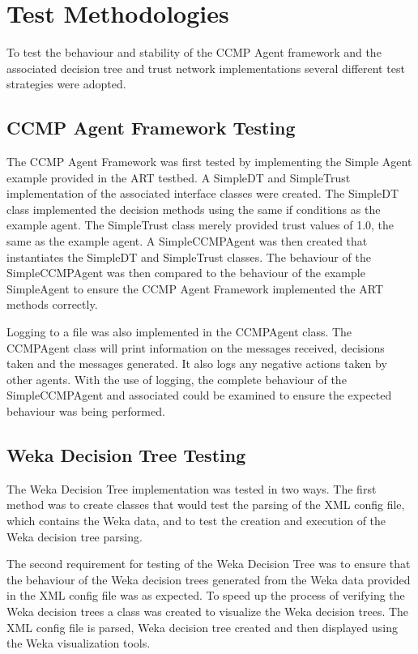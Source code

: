 \section{Test Methodologies}
To test the behaviour and stability of the CCMP Agent framework and the
associated decision tree and trust network implementations several different test
strategies were adopted.

\subsection{CCMP Agent Framework Testing}
The CCMP Agent Framework was first tested by implementing the
Simple Agent example provided in the ART testbed.  A SimpleDT and
SimpleTrust implementation of the associated interface classes were created.
The SimpleDT class implemented the decision methods using the same if conditions
as the example agent.  The SimpleTrust class merely provided trust values of
1.0, the same as the example agent.  A SimpleCCMPAgent was then created that
instantiates the SimpleDT and SimpleTrust classes.  The behaviour of the
SimpleCCMPAgent was then compared to the behaviour of the example SimpleAgent
to ensure the CCMP Agent Framework implemented the ART methods correctly.

Logging to a file was also implemented in the CCMPAgent class.  The CCMPAgent
class will print information on the messages received, decisions taken and the
messages generated.  It also logs any negative actions taken by other agents.
With the use of logging, the complete behaviour of the SimpleCCMPAgent and
associated  could be examined to ensure the expected behaviour was being
performed.

\subsection{Weka Decision Tree Testing}
The Weka Decision Tree implementation was tested in two ways.  The first
method was to create classes that would test the parsing of the XML config
file, which contains the Weka data, and to test the creation and execution of
the Weka decision tree parsing.

The second requirement for testing of the Weka Decision Tree was to ensure
that the behaviour of the Weka decision trees generated from the Weka data
provided in the XML config file was as expected.  To speed up the process of
verifying the Weka decision trees a class was created to visualize the Weka
decision trees.  The XML config file is parsed, Weka decision tree created and
then displayed using the Weka visualization tools.

